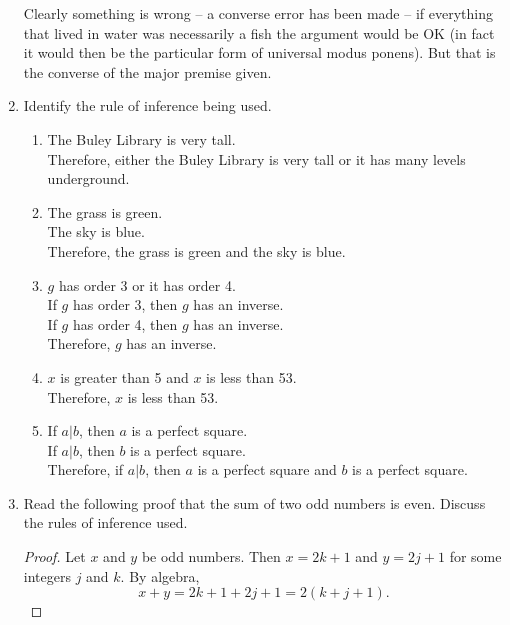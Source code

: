 \begin{enumerate}
{Clearly something is wrong -- a converse error has been made -- if everything that lived in water was necessarily a fish the argument would be OK (in fact it would then be the particular form of universal modus ponens).  But that is the converse of the major premise given.    
}

\item Identify the rule of inference being used.

\begin{enumerate}
\item The Buley Library is very tall.\\
Therefore, either the Buley Library is very tall or it has many
levels underground.


\item The grass is green.\\
The sky is blue.\\
Therefore, the grass is green and the sky is blue.


\item $g$ has order 3 or it has order 4.\\
If $g$ has order 3, then $g$ has an inverse.\\
If $g$ has order 4, then $g$ has an inverse.\\
Therefore, $g$ has an inverse.


\item $x$ is greater than 5 and $x$ is less than 53.\\
Therefore, $x$ is less than 53.


\item If $a|b$, then $a$ is a perfect square.\\
If $a|b$, then $b$ is a perfect square.\\
Therefore, if $a|b$, then $a$ is a perfect square and $b$ is
a perfect square.

\end{enumerate}

\item Read the following proof that the sum of two odd numbers is even.
Discuss the rules of inference used.\\
\begin{proof}
Let $x$ and $y$ be odd numbers. Then $x=2k+1$
and $y=2j+1$ for some integers $j$ and $k$. By algebra,
\[
x+y = 2k+1 + 2j+1 = 2(k+j+1).
\]


\end{proof}
\end{enumerate}
